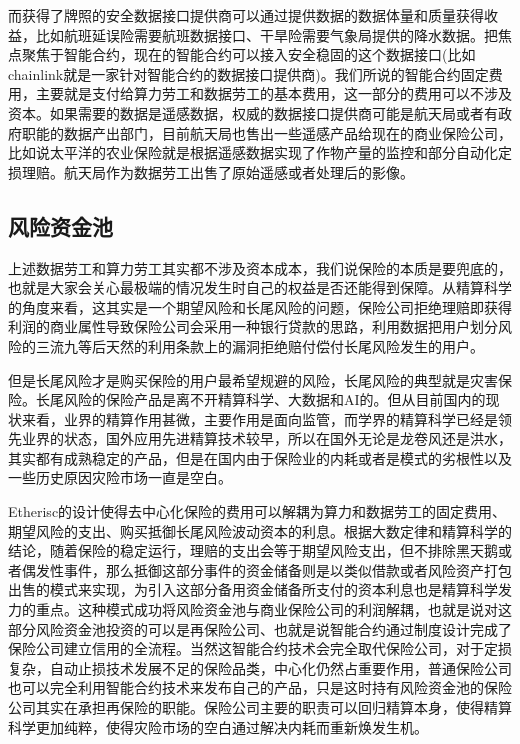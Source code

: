 \documentclass{ctexart}
\begin{document}
而获得了牌照的安全数据接口提供商可以通过提供数据的数据体量和质量获得收益，比如航班延误险需要航班数据接口、干旱险需要气象局提供的降水数据。把焦点聚焦于智能合约，现在的智能合约可以接入安全稳固的这个数据接口(比如chainlink就是一家针对智能合约的数据接口提供商)。我们所说的智能合约固定费用，主要就是支付给算力劳工和数据劳工的基本费用，这一部分的费用可以不涉及资本。如果需要的数据是遥感数据，权威的数据接口提供商可能是航天局或者有政府职能的数据产出部门，目前航天局也售出一些遥感产品给现在的商业保险公司，比如说太平洋的农业保险就是根据遥感数据实现了作物产量的监控和部分自动化定损理赔。航天局作为数据劳工出售了原始遥感或者处理后的影像。


\subsection{风险资金池}

上述数据劳工和算力劳工其实都不涉及资本成本，我们说保险的本质是要兜底的，也就是大家会关心最极端的情况发生时自己的权益是否还能得到保障。从精算科学的角度来看，这其实是一个期望风险和长尾风险的问题，保险公司拒绝理赔即获得利润的商业属性导致保险公司会采用一种银行贷款的思路，利用数据把用户划分风险的三流九等后天然的利用条款上的漏洞拒绝赔付偿付长尾风险发生的用户。

但是长尾风险才是购买保险的用户最希望规避的风险，长尾风险的典型就是灾害保险。长尾风险的保险产品是离不开精算科学、大数据和AI的。但从目前国内的现状来看，业界的精算作用甚微，主要作用是面向监管，而学界的精算科学已经是领先业界的状态，国外应用先进精算技术较早，所以在国外无论是龙卷风还是洪水，其实都有成熟稳定的产品，但是在国内由于保险业的内耗或者是模式的劣根性以及一些历史原因灾险市场一直是空白。

Etherisc的设计使得去中心化保险的费用可以解耦为算力和数据劳工的固定费用、期望风险的支出、购买抵御长尾风险波动资本的利息。根据大数定律和精算科学的结论，随着保险的稳定运行，理赔的支出会等于期望风险支出，但不排除黑天鹅或者偶发性事件，那么抵御这部分事件的资金储备则是以类似借款或者风险资产打包出售的模式来实现，为引入这部分备用资金储备所支付的资本利息也是精算科学发力的重点。这种模式成功将风险资金池与商业保险公司的利润解耦，也就是说对这部分风险资金池投资的可以是再保险公司、也就是说智能合约通过制度设计完成了保险公司建立信用的全流程。当然这智能合约技术会完全取代保险公司，对于定损复杂，自动止损技术发展不足的保险品类，中心化仍然占重要作用，普通保险公司也可以完全利用智能合约技术来发布自己的产品，只是这时持有风险资金池的保险公司其实在承担再保险的职能。保险公司主要的职责可以回归精算本身，使得精算科学更加纯粹，使得灾险市场的空白通过解决内耗而重新焕发生机。
\end{document}
